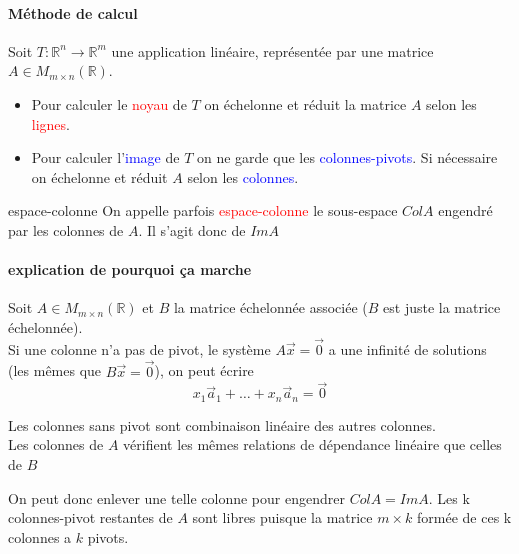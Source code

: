 \paragraph{Méthode de calcul}
Soit $T : \mathbb{R}^n \to \mathbb{R}^m$ une application linéaire, représentée par une matrice $A \in M_{m\times n}(\mathbb{R})$.
\begin{itemize}
    \item Pour calculer le \textcolor{red}{noyau} de $T$ on échelonne et réduit la matrice $A$ selon les \textcolor{red}{lignes}.
    \item Pour calculer l'\textcolor{blue}{image} de $T$ on ne garde que les \textcolor{blue}{colonnes-pivots}. Si nécessaire on échelonne et réduit $A$ selon les \textcolor{blue}{colonnes}.
\end{itemize}

\begin{framedremark}{espace-colonne}
    On appelle parfois \textcolor{red}{espace-colonne} le sous-espace $ColA$ engendré par les colonnes de $A$. Il s'agit donc de $Im A$
\end{framedremark}
\paragraph{explication de pourquoi ça marche}
Soit $A \in M_{m\times n}(\mathbb{R})$ et $B$ la matrice échelonnée associée ($B$ est juste la matrice échelonnée).
\\
Si une colonne n'a pas de pivot, le système $A\vec{x} = \vec{0} $ a une infinité de solutions (les mêmes que $B\vec{x} = \vec{0}$), on peut écrire
\[x_1\vec{a}_1 + \dots + x_n\vec{a}_n = \vec{0}\]


\begin{framedremark}
    Les colonnes sans pivot sont combinaison linéaire des autres colonnes.\\ Les colonnes de $A$ vérifient les mêmes relations de dépendance linéaire que celles de $B$
\end{framedremark}
On peut donc enlever une telle colonne pour engendrer $ColA = ImA$. Les k colonnes-pivot restantes de $A$ sont libres puisque la matrice $m\times k$ formée de ces k colonnes a $k$ pivots.

